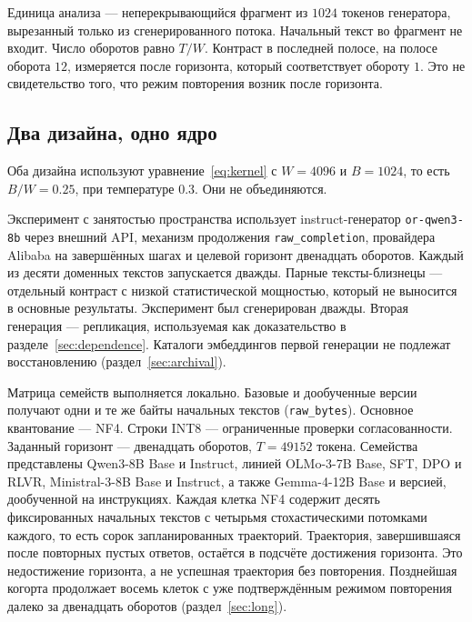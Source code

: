 \documentclass[10pt]{article}
\begin{document}
Единица анализа --- неперекрывающийся фрагмент из $1024$ токенов генератора,
вырезанный только из сгенерированного потока. %
Начальный текст во фрагмент не входит.
Число оборотов равно $T/W$.
Контраст в последней полосе, на полосе оборота $12$, измеряется
после горизонта, который соответствует обороту $1$.
Это не свидетельство того, что режим повторения возник после горизонта.

\subsection{Два дизайна, одно ядро}
\label{sec:designs}

Оба дизайна используют уравнение~\eqref{eq:kernel} с $W{=}4096$
и $B{=}1024$, то есть $B/W{=}0.25$, при температуре $0.3$. %
Они не объединяются.

Эксперимент с занятостью пространства использует instruct-генератор
\texttt{or-qwen3-8b} через внешний API, механизм продолжения
\texttt{raw\_completion}, провайдера Alibaba на завершённых шагах
и целевой горизонт двенадцать оборотов. %
Каждый из десяти доменных текстов запускается дважды.
Парные тексты-близнецы --- отдельный контраст с низкой статистической
мощностью, который не выносится в основные результаты.
Эксперимент был сгенерирован дважды.
Вторая генерация --- репликация, используемая как доказательство
в разделе~\ref{sec:dependence}. %
Каталоги эмбеддингов первой генерации не подлежат восстановлению
(раздел~\ref{sec:archival}).

Матрица семейств выполняется локально.
Базовые и дообученные версии получают одни и те же байты начальных текстов
(\texttt{raw\_bytes}).
Основное квантование --- NF4.
Строки INT8 --- ограниченные проверки согласованности.
Заданный горизонт --- двенадцать оборотов, $T{=}49152$ токена. %
Семейства представлены Qwen3-8B Base и Instruct, линией OLMo-3-7B
Base, SFT, DPO и RLVR, Ministral-3-8B Base и Instruct,
а также Gemma-4-12B Base и версией, дообученной на инструкциях.
Каждая клетка NF4 содержит десять фиксированных начальных текстов
с четырьмя стохастическими потомками каждого, то есть сорок
запланированных траекторий. %
Траектория, завершившаяся после повторных пустых ответов,
остаётся в подсчёте достижения горизонта.
Это недостижение горизонта, а не успешная траектория без повторения.
Позднейшая когорта продолжает восемь клеток с уже подтверждённым
режимом повторения далеко за двенадцать оборотов
(раздел~\ref{sec:long}).
\end{document}

